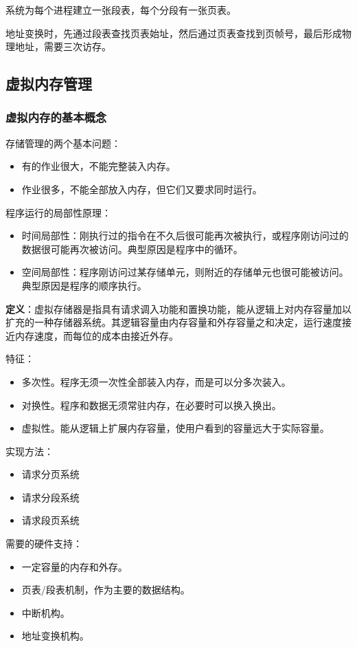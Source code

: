 \documentclass[12pt, a4paper, oneside]{ctexart}
\begin{document}
系统为每个进程建立一张段表，每个分段有一张页表。

地址变换时，先通过段表查找页表始址，然后通过页表查找到页帧号，最后形成物理地址，需要三次访存。

\subsection{虚拟内存管理}

\subsubsection{虚拟内存的基本概念}

存储管理的两个基本问题：
\begin{itemize}
  \item 有的作业很大，不能完整装入内存。
  \item 作业很多，不能全部放入内存，但它们又要求同时运行。
\end{itemize}

程序运行的局部性原理：
\begin{itemize}
  \item 时间局部性：刚执行过的指令在不久后很可能再次被执行，或程序刚访问过的数据很可能再次被访问。典型原因是程序中的循环。
  \item 空间局部性：程序刚访问过某存储单元，则附近的存储单元也很可能被访问。典型原因是程序的顺序执行。
\end{itemize}

\textbf{定义}：虚拟存储器是指具有请求调入功能和置换功能，能从逻辑上对内存容量加以扩充的一种存储器系统。其逻辑容量由内存容量和外存容量之和决定，运行速度接近内存速度，而每位的成本由接近外存。

特征：
\begin{itemize}
  \item 多次性。程序无须一次性全部装入内存，而是可以分多次装入。
  \item 对换性。程序和数据无须常驻内存，在必要时可以换入换出。
  \item 虚拟性。能从逻辑上扩展内存容量，使用户看到的容量远大于实际容量。
\end{itemize}

实现方法：
\begin{itemize}
  \item 请求分页系统
  \item 请求分段系统
  \item 请求段页系统
\end{itemize}

需要的硬件支持：
\begin{itemize}
  \item 一定容量的内存和外存。
  \item 页表/段表机制，作为主要的数据结构。
  \item 中断机构。
  \item 地址变换机构。
\end{itemize}
\end{document}
